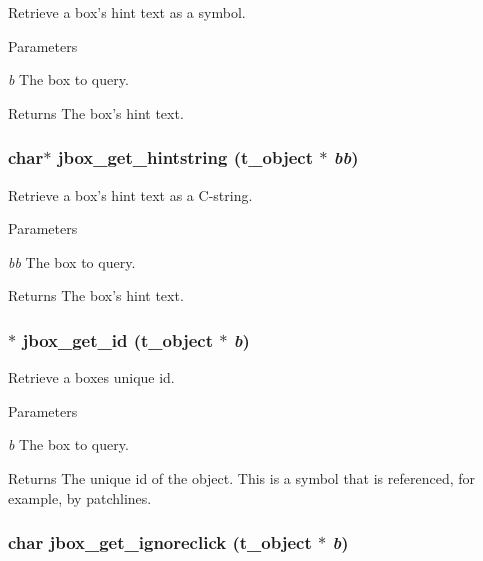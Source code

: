 Retrieve a box's hint text as a symbol. 
\begin{DoxyParams}{Parameters}
\item[{\em b}]The box to query. \end{DoxyParams}
\begin{DoxyReturn}{Returns}
The box's hint text. 
\end{DoxyReturn}
\hypertarget{group__jbox_ga80ff8da64e1e96abb21ae7e528c757c8}{
\subsubsection[{jbox\_\-get\_\-hintstring}]{\setlength{\rightskip}{0pt plus 5cm}char$\ast$ jbox\_\-get\_\-hintstring ({\bf t\_\-object} $\ast$ {\em bb})}}
\label{group__jbox_ga80ff8da64e1e96abb21ae7e528c757c8}


Retrieve a box's hint text as a C-\/string. 
\begin{DoxyParams}{Parameters}
\item[{\em bb}]The box to query. \end{DoxyParams}
\begin{DoxyReturn}{Returns}
The box's hint text. 
\end{DoxyReturn}
\hypertarget{group__jbox_ga0b2499248b44f3f138407129f39f274e}{
\subsubsection[{jbox\_\-get\_\-id}]{$\ast$ jbox\_\-get\_\-id ({\bf t\_\-object} $\ast$ {\em b})}}
\label{group__jbox_ga0b2499248b44f3f138407129f39f274e}


Retrieve a boxes unique id. 
\begin{DoxyParams}{Parameters}
\item[{\em b}]The box to query. \end{DoxyParams}
\begin{DoxyReturn}{Returns}
The unique id of the object. This is a symbol that is referenced, for example, by patchlines. 
\end{DoxyReturn}
\hypertarget{group__jbox_gaa84d6ce8c5dbd9fc69acc603b69a5fb0}{
\subsubsection[{jbox\_\-get\_\-ignoreclick}]{\setlength{\rightskip}{0pt plus 5cm}char jbox\_\-get\_\-ignoreclick ({\bf t\_\-object} $\ast$ {\em b})}}
\label{group__jbox_gaa84d6ce8c5dbd9fc69acc603b69a5fb0}


